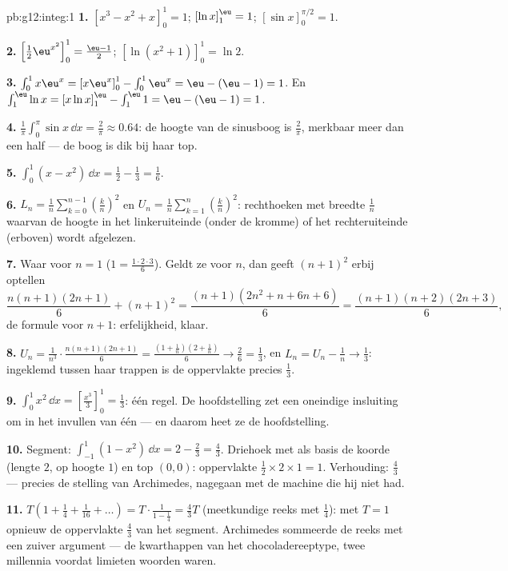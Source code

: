 \begin{solution}{pb:g12:integ:1}
\textbf{1.} $\left[x^3 - x^2 + x\right]_0^1 = 1$; \quad
$\left[\ln x\right]_1^{\eu} = 1$; \quad
$\left[\sin x\right]_0^{\pi/2} = 1$.

\textbf{2.} $\left[\frac12 \eu^{x^2}\right]_0^1 = \frac{\eu - 1}{2}$; \quad
$\left[\ln(x^2 + 1)\right]_0^1 = \ln 2$.

\textbf{3.} $\int_0^1 x\eu^x = \left[x\eu^x\right]_0^1 - \int_0^1 \eu^x =
\eu - (\eu - 1) = 1$. En
$\int_1^{\eu} \ln x = \left[x\ln x\right]_1^{\eu} - \int_1^{\eu} 1 =
\eu - (\eu - 1) = 1$.

\textbf{4.} $\frac{1}{\pi}\int_0^\pi \sin x\,\dd x = \frac{2}{\pi} \approx
0.64$: de  hoogte van de sinusboog is $\frac2\pi$, merkbaar meer
dan een half --- de boog is dik bij haar top.

\textbf{5.} $\int_0^1 (x - x^2)\,\dd x = \frac12 - \frac13 = \frac16$.

\textbf{6.} $L_n = \frac1n \sum_{k=0}^{n-1} \left(\frac kn\right)^2$ en
$U_n = \frac1n \sum_{k=1}^{n} \left(\frac kn\right)^2$: rechthoeken met
breedte $\frac1n$ waarvan de hoogte in het linkeruiteinde (onder de kromme)
of het rechteruiteinde (erboven) wordt afgelezen.

\textbf{7.} Waar voor $n = 1$ ($1 = \frac{1 \cdot 2 \cdot 3}{6}$). Geldt ze
voor $n$, dan geeft $(n+1)^2$ erbij optellen
\[
\frac{n(n+1)(2n+1)}{6} + (n+1)^2
= \frac{(n+1)\left(2n^2 + n + 6n + 6\right)}{6}
= \frac{(n+1)(n+2)(2n+3)}{6},
\]
de formule voor $n + 1$: erfelijkheid, klaar.

\textbf{8.} $U_n = \frac{1}{n^3} \cdot \frac{n(n+1)(2n+1)}{6} =
\frac{(1 + \frac1n)(2 + \frac1n)}{6} \to \frac26 = \frac13$, en
$L_n = U_n - \frac1n \to \frac13$: ingeklemd tussen haar trappen is de
oppervlakte precies $\frac13$.

\textbf{9.} $\int_0^1 x^2\,\dd x = \left[\frac{x^3}{3}\right]_0^1 =
\frac13$: één regel. De hoofdstelling zet een oneindige insluiting om in het
invullen van één  --- en daarom heet ze de hoofdstelling.

\textbf{10.} Segment: $\int_{-1}^{1}(1 - x^2)\,\dd x = 2 - \frac23 =
\frac43$. Driehoek met als basis de koorde (lengte $2$, op hoogte $1$) en top
$(0,0)$: oppervlakte $\frac12 \times 2 \times 1 = 1$. Verhouding: $\frac43$
--- precies de stelling van Archimedes, nagegaan met de machine die hij niet
had.

\textbf{11.} $T\left(1 + \frac14 + \frac{1}{16} + \dots\right) = T \cdot
\frac{1}{1 - \frac14} = \frac43 T$ (meetkundige reeks met  $\frac14$):
met $T = 1$ opnieuw de oppervlakte $\frac43$ van het segment. Archimedes
sommeerde de reeks met een zuiver  argument --- de kwarthappen van
het chocoladereeptype, twee millennia voordat limieten woorden waren.


\end{solution}
